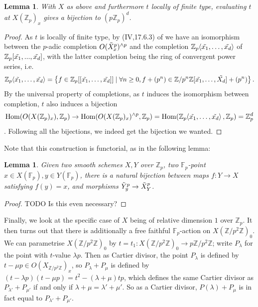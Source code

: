 \documentclass{article}
\newcommand{\Z}{\mathbb{Z}}
\newcommand{\F}{\mathbb{F}}
\renewcommand{\angle}[1]{\hspace{-2pt}\left\langle #1 \right\rangle}
\DeclareMathOperator{\Hom}{Hom}
\theoremstyle{plain}
\newtheorem{lem}[thm]{Lemma} %
\theoremstyle{definition}
\theoremstyle{remark}
\begin{document}
\begin{lem}
With $X$ as above and furthermore $t$ locally of finite type, evaluating $t$ at $X(\Z_p)_x$ gives a bijection to $(p\Z_p)^d$.
\end{lem}
\begin{proof}
As $t$ is locally of finite type, by (IV,17.6.3) of \cite{ega} we have an isomorphism between the $p$-adic completion $O(\Tilde{X}_x^p)^{\wedge p}$ and the completion $\Z_p\angle{\Tilde{x_1},\dots, \Tilde{x_d}}$ of $\Z_p[\Tilde{x_1},...,\Tilde{x_d}]$, with the latter completion being the ring of convergent power series, i.e.
\[
\Z_p\angle{\Tilde{x_1},\dots, \Tilde{x_d}} = \left\{f \in \Z_p[[\Tilde{x_1},\dots,\Tilde{x_d}]] \mid \forall n \geq 0, f + (p^n) \in \Z/p^n\Z[\Tilde{x_1},\dots,\tilde{X_d}] + (p^n) \right\}.
\]
By the universal property of completions, as $t$ induces the isomorphism between completion, $t$ also induces a bijection $$\Hom(O(X(\Z_p)_x), \Z_p) \to \Hom(O(X(\Z_p)_x)^{\wedge p}, \Z_p) = \Hom(\Z_p\angle{\Tilde{x_1},\dots,\Tilde{x_d}},\Z_p) = \Z_p^d$$. Following all the bijections, we indeed get the bijection we wanted.
\end{proof}

Note that this construction is functorial, as in the following lemma:
\begin{lem}
Given two smooth schemes $X,Y$ over $\Z_p$, two $\F_p$-point $x\in X(\F_p), y\in Y(\F_p)$, there is a natural bijection between maps $f: Y \to X$ satisfying $f(y) = x$, and morphisms $\Tilde{Y}_y^p \to \Tilde{X}_Y^p$. 
\end{lem}
\begin{proof}
TODO
Is this even necessary?
\end{proof}

Finally, we look at the specific case of $X$ being of relative dimension $1$ over $\Z_p$. It then turns out that there is additionally a free faithful $\F_p$-action on $X(\Z/p^2\Z)_0$. We can parametrise $X(\Z/p^2\Z)_0$ by $t = t_1 : X(\Z/p^2\Z)_0 \to p\Z/p^2\Z$; write $P_{\lambda}$ for the point with $t$-value $\lambda p$. Then as Cartier divisor, the point $P_{\lambda}$ is defined by $t - \mu p \in O(X_{\Z/p^2\Z})_x$, so $P_{\lambda} + P_{\mu}$ is defined by $(t-\lambda p)(t-\mu p) = t^2 - (\lambda + \mu)tp$, which defines the same Cartier divisor as $P_{\lambda'} + P_{\mu'}$ if and only if $\lambda + \mu = \lambda' + \mu'$. So as a Cartier divisor, $P(\lambda) + P_{\mu}$ is in fact equal to $P_{\lambda'} + P_{\mu'}$.
\end{document}
